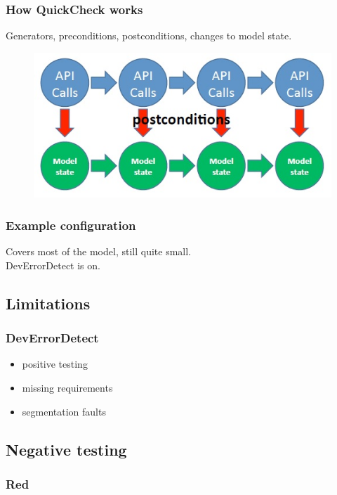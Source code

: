 \documentclass{beamer}
\begin{document}
\begin{frame}
  \frametitle{How QuickCheck works}
  Generators, preconditions, postconditions, changes to model state.
  \begin{figure}
    \includegraphics[keepaspectratio, width=0.7\linewidth]{api_calls}
  \end{figure}
\end{frame}

\begin{frame}
  \frametitle{Example configuration}
  Covers most of the model, still quite small.\\
  DevErrorDetect is on.\\
\end{frame}

\subsection{Limitations}

\begin{frame}
  \frametitle{DevErrorDetect}
  \begin{itemize}
    \item positive testing
    \item missing requirements
    \item segmentation faults
  \end{itemize}
\end{frame}

\subsection{Negative testing}

\begin{frame}
  \frametitle{Red}
\end{frame}

\end{document}
